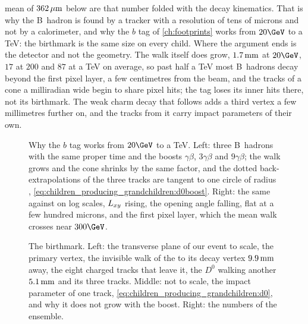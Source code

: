mean of $362\,\mu\mathrm{m}$ below are that number folded with the decay kinematics.
That is why the B~hadron is found by a tracker with a resolution of tens
of microns and not by a calorimeter, and why the $b$ tag of
\cref{ch:footprints} works from $20\GeV$ to a TeV: the birthmark is the
same size on every child. Where the argument ends is the detector and
not the geometry. The walk itself does grow, $1.7\,\mathrm{mm}$ at $20\GeV$, $17$
at $200$ and $87$ at a TeV on average, so past half a TeV most B~hadrons
decay beyond the first pixel layer, a few centimetres from the beam, and
the tracks of a cone a milliradian wide begin to share pixel hits; the
tag loses its inner hits there, not its birthmark. The weak charm decay
that follows adds a third vertex a few millimetres further on, and the
tracks from it carry impact parameters of their own.

\begin{figure}[htbp]\centering
\resizebox{\textwidth}{!}{}
\caption[Why the impact parameter does not grow with the boost]{Why the
$b$ tag works from $20\GeV$ to a TeV. Left: three B~hadrons with the same
proper time and the boosts $\gamma\beta$, $3\gamma\beta$ and
$9\gamma\beta$; the walk grows and the cone shrinks by the same factor,
and the dotted back-extrapolations of the three tracks are tangent to one
circle of radius \dzero,
\cref{eq:children_producing_grandchildren:d0boost}. Right: the same
against \pt on log scales, $L_{xy}$ rising, the opening angle falling,
\dzero flat at a few hundred microns, and the first pixel layer, which
the mean walk crosses near $300\GeV$.}
\label{fig:children_producing_grandchildren:boost_sketch}
\end{figure}

\begin{figure}[htbp]\centering
\resizebox{\textwidth}{!}{}
\caption[The decay vertices of our event and the impact parameter]{The
birthmark. Left: the transverse plane of our event to scale, the primary
vertex, the invisible walk of the \Bbar to its decay vertex $9.9\,\mathrm{mm}$ away,
the eight charged tracks that leave it, the $D^0$ walking another $5.1\,\mathrm{mm}$
and its three tracks. Middle: not to scale, the impact parameter of one
track, \cref{eq:children_producing_grandchildren:d0}, and why it does not
grow with the boost. Right: the numbers of the ensemble.}
\label{fig:children_producing_grandchildren:vertex_sketch}
\end{figure}

